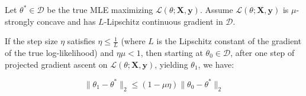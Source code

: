 \begin{proposition}\label{prop:one-step-improvement-on-true-log-likelihood}
Let $\theta^*\in \mathcal{D}$ be the true MLE maximizing $\mathcal{L}(\theta; \mathbf{X}, \mathbf{y})$. Assume $\mathcal{L}(\theta; \mathbf{X}, \mathbf{y})$ is $\mu$-strongly concave and has $L$-Lipschitz continuous gradient in $\mathcal{D}$.

If the step size $\eta$ satisfies $\eta \leq \frac{1}{L}$ (where $L$ is the Lipschitz constant of the gradient of the true log-likelihood) and $\eta\mu < 1$,
then starting at $\theta_0\in \mathcal{D}$, after one step of projected gradient ascent on $\mathcal{L}(\theta; \mathbf{X}, \mathbf{y})$, yielding $\theta_1$, we have:

$$
\| \theta_1 - \theta^* \|_2 \leq (1 - \mu \eta) \| \theta_0 - \theta^* \|_2
$$

\end{proposition}
